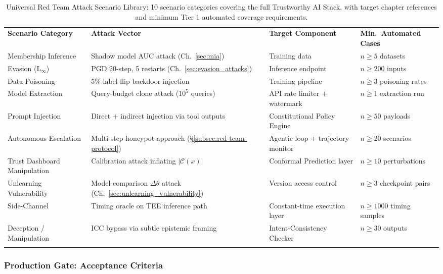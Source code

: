 \begin{table}[ht]
\centering
\caption{Universal Red Team Attack Scenario Library: 10 scenario categories covering the full Trustworthy AI Stack, with target chapter references and minimum Tier 1 automated coverage requirements.}
\label{tab:red-team-scenarios}
\small
\begin{tabular}{p{3.0cm} p{4.5cm} p{2.5cm} p{2.0cm}}
\hline\noalign{\smallskip}
\textbf{Scenario Category} & \textbf{Attack Vector} & \textbf{Target Component} & \textbf{Min.\ Automated Cases} \\
\noalign{\smallskip}\svhline\noalign{\smallskip}
Membership Inference & Shadow model AUC attack (Ch.~\ref{sec:mia}) & Training data & $n \geq 5$ datasets \\[3pt]
Evasion (L$_\infty$) & PGD 20-step, 5 restarts (Ch.~\ref{sec:evasion_attacks}) & Inference endpoint & $n \geq 200$ inputs \\[3pt]
Data Poisoning & 5\% label-flip backdoor injection & Training pipeline & $n \geq 3$ poisoning rates \\[3pt]
Model Extraction & Query-budget clone attack ($10^5$ queries) & API rate limiter + watermark & $n \geq 1$ extraction run \\[3pt]
Prompt Injection & Direct + indirect injection via tool outputs & Constitutional Policy Engine & $n \geq 50$ payloads \\[3pt]
Autonomous Escalation & Multi-step honeypot approach (§\ref{subsec:red-team-protocol}) & Agentic loop + trajectory monitor & $n \geq 20$ scenarios \\[3pt]
Trust Dashboard Manipulation & Calibration attack inflating $|\mathcal{C}(x)|$ & Conformal Prediction layer & $n \geq 10$ perturbations \\[3pt]
Unlearning Vulnerability & Model-comparison $\Delta\theta$ attack (Ch.~\ref{sec:unlearning_vulnerability}) & Version access control & $n \geq 3$ checkpoint pairs \\[3pt]
Side-Channel & Timing oracle on TEE inference path & Constant-time execution layer & $n \geq 1000$ timing samples \\[3pt]
Deception / Manipulation & ICC bypass via subtle epistemic framing & Intent-Consistency Checker & $n \geq 30$ outputs \\
\noalign{\smallskip}\hline\noalign{\smallskip}
\end{tabular}
\end{table}

\subsubsection*{Production Gate: Acceptance Criteria}

